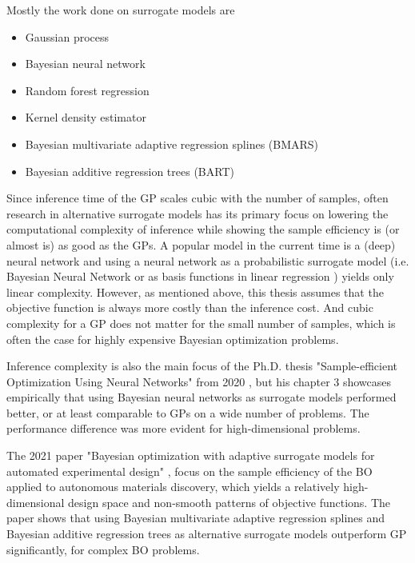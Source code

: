 Mostly the work done on surrogate models are 



\begin{itemize}[noitemsep]
    \item Gaussian process
    \item Bayesian neural network
    \item Random forest regression
    \item Kernel density estimator
    \item Bayesian multivariate adaptive regression splines (BMARS)
    \item Bayesian additive regression trees (BART)
\end{itemize}

Since inference time of the GP scales cubic with the number of samples, often research in
alternative surrogate models has its primary focus on lowering the computational complexity of
inference while showing the sample efficiency is (or almost is) as good as the GPs. A popular model
in the current time is a (deep) neural network and using a neural network as a probabilistic
surrogate model (i.e. Bayesian Neural Network \cite{BOHAMIANN} or as basis functions in linear
regression \cite{DNGO}) yields only linear complexity. However, as mentioned above, this thesis
assumes that the objective function is always more costly than the inference cost. And cubic
complexity for a GP does not matter for the small number of samples, which is often the case for
highly expensive Bayesian optimization problems. 

Inference complexity is also the main focus of the Ph.D. thesis "Sample-efficient Optimization Using
Neural Networks" from 2020 \cite{PhDthesis}, but his chapter 3 showcases empirically that using Bayesian
neural networks as surrogate models performed better, or at least comparable to GPs on a wide number
of problems. The performance difference was more evident for high-dimensional problems.

The 2021 paper "Bayesian optimization with adaptive surrogate models for automated experimental design"
\cite{Nature_BO_paper}, focus on the sample efficiency of the BO applied to autonomous materials discovery, 
which yields a relatively high-dimensional design space and non-smooth patterns of objective functions.  
The paper shows that using Bayesian multivariate adaptive regression splines
and Bayesian additive regression trees as alternative surrogate models outperform GP significantly, 
for complex BO problems. 

